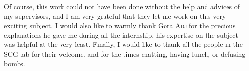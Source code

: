 \documentclass[a4paper,11pt]{article}
\theoremstyle{break}
\theoremstyle{sc}
\theoremstyle{definition}
\theoremstyle{remark}
\begin{document}
Of course, this work could not have been done without the help and advices of my
supervisors, and I am very grateful that they let me work on this very exciting
subject. I would also like to warmly thank Gora \textsc{Adj} for the
precious explanations he gave me during all the internship, his expertise on the
subject was helpful at the very least. Finally, I would like to thank all the
people in the SCG lab for their welcome, and for the times chatting, having
lunch, or \href{http://www.keeptalkinggame.com/}{defusing bombs}.



\end{document}
